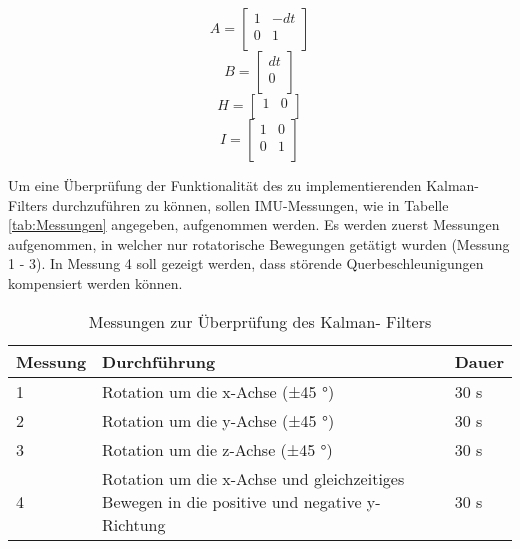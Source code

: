 \begin{equation*}
A = 
\begin{bmatrix}
1 & -dt \\
0 & 1   \\
\end{bmatrix}
\end{equation*}
\begin{equation*}
B = 
\begin{bmatrix}
dt \\
0  \\
\end{bmatrix}
\end{equation*}
\begin{equation*}
H = 
\begin{bmatrix}
1 & 0 \\
\end{bmatrix}
\end{equation*}
\begin{equation*}
I = 
\begin{bmatrix}
1 & 0 \\
0 & 1 \\
\end{bmatrix}
\end{equation*}

Um eine Überprüfung der Funktionalität des zu implementierenden Kalman-Filters durchzuführen zu können, sollen IMU-Messungen, wie in Tabelle  \ref{tab:Messungen} angegeben, aufgenommen werden. Es werden zuerst Messungen aufgenommen, in welcher nur rotatorische Bewegungen getätigt wurden (Messung 1 - 3). In Messung 4 soll gezeigt werden, dass störende Querbeschleunigungen kompensiert werden können.

\begin{table}[h]
	\centering
	\begin{tabular}{|p{2cm}|p{10.6cm}|p{2cm}|}
		\hline
		\rowcolor{lightgray}\textbf{Messung} & \textbf{Durchführung} & \textbf{Dauer} \\
		\hline
		1	&Rotation um die x-Achse (±45 °)		& 30 s\\
		\hline
		2	&Rotation um die y-Achse (±45 °)		& 30 s\\
		\hline
		3	&Rotation um die z-Achse (±45 °)		& 30 s\\
		\hline
		4	&Rotation um die x-Achse und gleichzeitiges Bewegen in die positive und negative y-Richtung			& 30 s\\
		\hline
	\end{tabular}
	\caption{Messungen zur Überprüfung des Kalman- Filters}
	\label{tab:Angabe Kalman-Filter}
\end{table}
